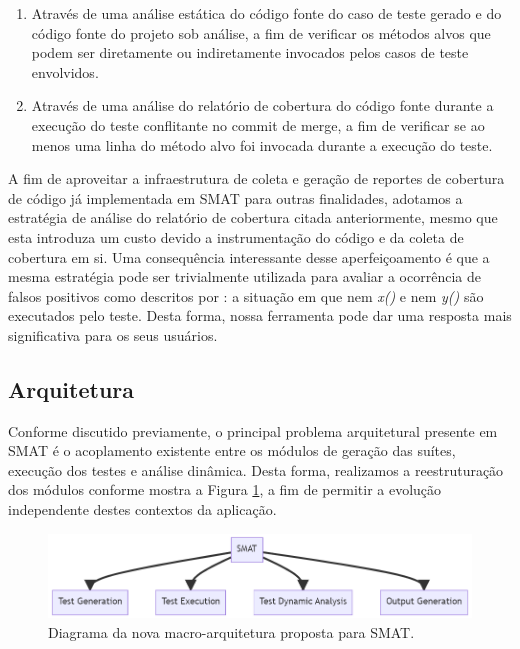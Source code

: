 \documentclass[12pt]{article}
\begin{document}
\begin{enumerate}
    \item Através de uma análise estática do código fonte do caso de teste gerado e do código fonte do projeto sob análise, a fim de verificar os métodos alvos que podem ser diretamente ou indiretamente invocados pelos casos de teste envolvidos.
    \item Através de uma análise do relatório de cobertura do código fonte durante a execução do teste conflitante no commit de merge, a fim de verificar se ao menos uma linha do método alvo foi invocada durante a execução do teste.
\end{enumerate}

A fim de aproveitar a infraestrutura de coleta e geração de reportes de cobertura de código já implementada em SMAT para outras finalidades, adotamos a estratégia de análise do relatório de cobertura citada anteriormente, mesmo que esta introduza um custo devido a instrumentação do código e da coleta de cobertura em si. Uma consequência interessante desse aperfeiçoamento é que a mesma estratégia pode ser trivialmente utilizada para avaliar a ocorrência de falsos positivos como descritos por \cite{leuson:tese}: a situação em que nem \textit{x()} e nem \textit{y()} são executados pelo teste. Desta forma, nossa ferramenta pode dar uma resposta mais significativa para os seus usuários.

\subsection{Arquitetura}
Conforme discutido previamente, o principal problema arquitetural presente em SMAT é o acoplamento existente entre os módulos de geração das suítes, execução dos testes e análise dinâmica. Desta forma, realizamos a reestruturação dos módulos conforme mostra a Figura \ref{fig:macro}, a fim de permitir a evolução independente destes contextos da aplicação.

\begin{figure}[H]
    \centering
    \includegraphics[width=\textwidth]{imagens/macro.png}
    \caption{Diagrama da nova macro-arquitetura proposta para SMAT.}
    \label{fig:macro}
\end{figure}
\end{document}
